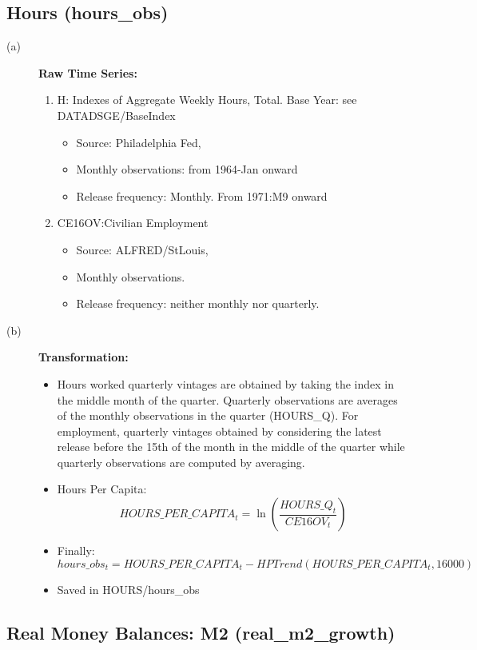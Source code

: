 \documentclass[3p,review,times]{elsarticle}		%
\begin{document}
\subsection{Hours (hours\_obs)}
\begin{description}
	\item[(a)] \textbf{Raw Time Series:}
	\begin{enumerate}
		\item H: Indexes of Aggregate Weekly Hours, Total. Base Year: see DATADSGE/BaseIndex
		\begin{itemize}
			\item Source: Philadelphia Fed,
			\item Monthly observations: from 1964-Jan onward
			\item Release frequency: Monthly. From 1971:M9 onward					 
		\end{itemize}
		\item CE16OV:Civilian Employment
		\begin{itemize}
			\item Source: ALFRED/StLouis,
			\item Monthly observations. 
			\item Release frequency: neither monthly nor quarterly.
		\end{itemize}
	\end{enumerate}
	\item[(b)] \textbf{Transformation:}
	\begin{itemize}
		\item Hours worked quarterly vintages are obtained by taking the index in the middle month of the quarter. Quarterly observations are averages of the monthly observations in the quarter (HOURS\_Q). For employment, quarterly vintages obtained by considering the latest release before the 15th of the month in the middle of the quarter while quarterly observations are computed by averaging.
		\item Hours Per Capita:
		$$HOURS\_PER\_CAPITA_t=\ln\left(\frac{HOURS\_Q_t}{CE16OV_t}\right)$$
		\item  Finally:
		$$hours\_obs_t=HOURS\_PER\_CAPITA_t-HPTrend(HOURS\_PER\_CAPITA_t, 16000)$$
		\item  Saved in HOURS/hours\_obs
	\end{itemize}			
\end{description}
\subsection{Real Money Balances: M2 (real\_m2\_growth)}
\end{document}
